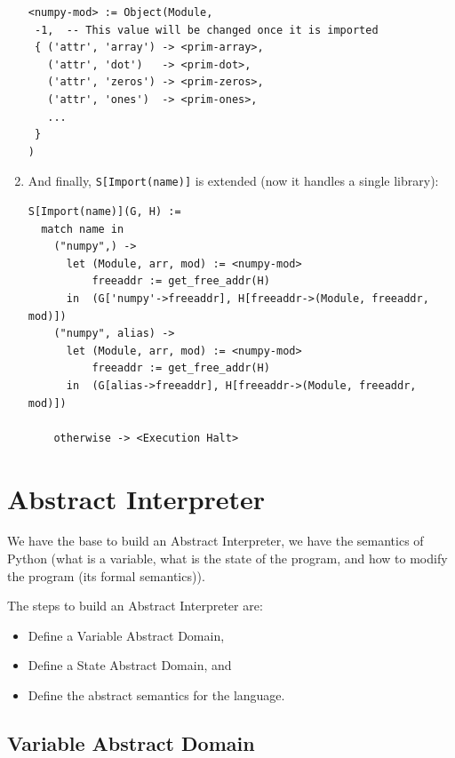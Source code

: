 \documentclass[
11pt, %
english, %
singlespacing, %
headsepline, %
]{MastersDoctoralThesis} %
\providecommand{\tightlist}{%
  \setlength{\itemsep}{0pt}\setlength{\parskip}{0pt}}
\begin{document}
\begin{enumerate}
\begin{verbatim}
<numpy-mod> := Object(Module,
 -1,  -- This value will be changed once it is imported
 { ('attr', 'array') -> <prim-array>,
   ('attr', 'dot')   -> <prim-dot>,
   ('attr', 'zeros') -> <prim-zeros>,
   ('attr', 'ones')  -> <prim-ones>,
   ...
 }
)
\end{verbatim}
\item
  And finally, \texttt{S{[}Import(name){]}} is extended (now it handles
  a single library):

\begin{verbatim}
S[Import(name)](G, H) :=
  match name in
    ("numpy",) ->
      let (Module, arr, mod) := <numpy-mod>
          freeaddr := get_free_addr(H)
      in  (G['numpy'->freeaddr], H[freeaddr->(Module, freeaddr, mod)])
    ("numpy", alias) ->
      let (Module, arr, mod) := <numpy-mod>
          freeaddr := get_free_addr(H)
      in  (G[alias->freeaddr], H[freeaddr->(Module, freeaddr, mod)])

    otherwise -> <Execution Halt>
\end{verbatim}
\end{enumerate}

\hypertarget{abstract-interpreter}{%
\section{Abstract Interpreter}\label{abstract-interpreter}}

{}

We have the base to build an Abstract Interpreter, we have the semantics
of Python (what is a variable, what is the state of the program, and how
to modify the program (its formal semantics)).

The steps to build an Abstract Interpreter are:

\begin{itemize}
\tightlist
\item
  Define a Variable Abstract Domain,
\item
  Define a State Abstract Domain, and
\item
  Define the abstract semantics for the language.
\end{itemize}

\hypertarget{variable-abstract-domain}{%
\subsection{Variable Abstract Domain}\label{variable-abstract-domain}}
\end{document}

